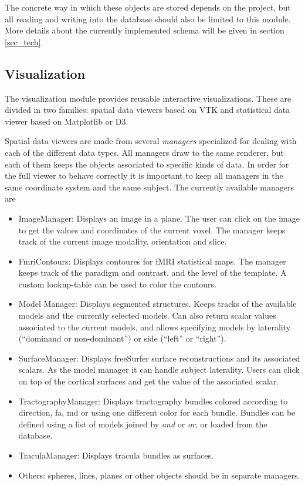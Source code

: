 The concrete way in which these objects are stored depends on the project, but all reading and writing into the database should also be limited to this module. More details about the currently implemented schema will be given in section \ref{sec_tech}.


\subsection{Visualization}

The visualization module provides reusable interactive visualizations. These are divided in two families: spatial data viewers based on VTK and statistical data viewer based on Matplotlib or D3.

Spatial data viewers are made from several \emph{managers} specialized for dealing with each of the different data types. All managers draw to the same renderer, but each of them keeps the objects associated to specific kinds of data. In order for the full viewer to behave correctly it is important to keep all managers in the same coordinate system and the same subject. The currently available managers are

\begin{itemize}
	\item ImageManager: Displays an image in a plane. The user can click on the image to get the values and coordinates of the current voxel. The manager keeps track of the current image modality, orientation and slice.
	\item FmriContours: Displays contoures for fMRI statistical maps. The manager keeps track of the paradigm and contrast, and the level of the template. A custom lookup-table can be used to color the contours.
	\item Model Manager: Displays segmented structures. Keeps tracks of the available models and the currently selected models. Can also return scalar values associated to the current models, and allows specifying models by laterality ("`dominand or non-dominant"') or side ("`left"' or "`right"').
	\item SurfaceManager: Displays freeSurfer surface reconstructions and its associated scalars. As the model manager it can handle subject laterality. Users can click on top of the cortical surfaces and get the value of the associated scalar.
	\item TractographyManager: Displays tractography bundles colored according to direction, fa, md or using one different color for each bundle. Bundles can be defined using a list of models joined by \emph{and} or \emph{or}, or loaded from the database.
	\item TraculaManager: Displays tracula bundles as surfaces.
	\item Others: spheres, lines, planes or other objects should be in separate managers.
\end{itemize}

